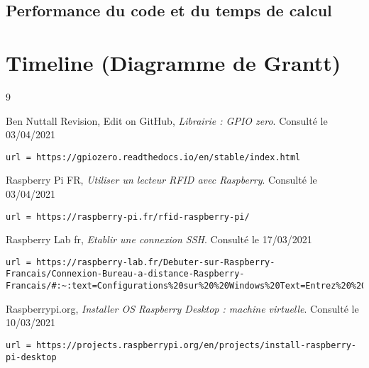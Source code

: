 \documentclass[a4paper]{report}
\begin{document}
            \subsection{Performance du code et du temps de calcul}
        \section{Timeline (Diagramme de Grantt)}
    
    
    
    
    \clearpage
    \begin{thebibliography}{9}

        \bibitem{}
            Ben Nuttall Revision, Edit on GitHub,
            \emph{Librairie : GPIO zero}. \newline
            Consulté le 03/04/2021
            \begin{verbatim}url = https://gpiozero.readthedocs.io/en/stable/index.html   
            \end{verbatim}

        \bibitem{}
            Raspberry Pi FR,
            \emph{Utiliser un lecteur RFID avec Raspberry}. \newline
            Consulté le 03/04/2021
            \begin{verbatim}url = https://raspberry-pi.fr/rfid-raspberry-pi/  
            \end{verbatim}
            
        \bibitem{}\label{bib:Connexion SSH}
            Raspberry Lab fr,
            \emph{Etablir une connexion SSH}. \newline
            Consulté le 17/03/2021
            \begin{verbatim}url = https://raspberry-lab.fr/Debuter-sur-Raspberry-Francais/Connexion-Bureau-a-distance-Raspberry-Francais/#:~:text=Configurations%20sur%20%20Windows%20Text=Entrez%20%20simplement%20%20l'adresse%20IP,pi%20%20et%20%20raspberry)%20%20et%20%20validez.  
            \end{verbatim}
            
         \bibitem{}\label{bib:raspebrry_os}
            Raspberrypi.org,
            \emph{Installer OS Raspberry Desktop : machine virtuelle}. \newline
            Consulté le 10/03/2021
            \begin{verbatim}url = https://projects.raspberrypi.org/en/projects/install-raspberry-pi-desktop  
            \end{verbatim}

    \end{thebibliography}
\end{document}
